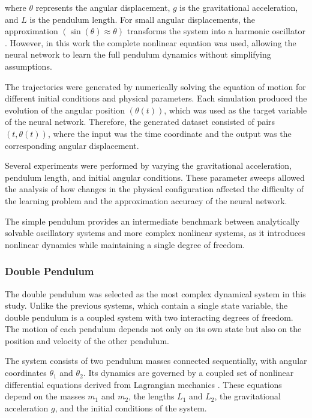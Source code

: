 where $\theta$ represents the angular displacement, $g$ is the gravitational acceleration, and $L$ is the pendulum length.
For small angular displacements, the approximation $(\sin(\theta)\approx\theta)$ transforms the system into a harmonic oscillator \cite{goldstein2002classical}. However, in this work the complete nonlinear equation was used, allowing the neural network to learn the full pendulum dynamics without simplifying assumptions.

The trajectories were generated by numerically solving the equation of motion for different initial conditions and physical parameters. Each simulation produced the evolution of the angular position $(\theta(t))$, which was used as the target variable of the neural network. Therefore, the generated dataset consisted of pairs $(t,\theta(t))$, where the input was the time coordinate and the output was the corresponding angular displacement.

Several experiments were performed by varying the gravitational acceleration, pendulum length, and initial angular conditions. These parameter sweeps allowed the analysis of how changes in the physical configuration affected the difficulty of the learning problem and the approximation accuracy of the neural network.

The simple pendulum provides an intermediate benchmark between analytically solvable oscillatory systems and more complex nonlinear systems, as it introduces nonlinear dynamics while maintaining a single degree of freedom.
\subsubsection{Double Pendulum}
The double pendulum was selected as the most complex dynamical system in this study. Unlike the previous systems, which contain a single state variable, the double pendulum is a coupled system with two interacting degrees of freedom. The motion of each pendulum depends not only on its own state but also on the position and velocity of the other pendulum.

The system consists of two pendulum masses connected sequentially, with angular coordinates $\theta_1$ and $\theta_2$. Its dynamics are governed by a coupled set of nonlinear differential equations derived from Lagrangian mechanics \cite{goldstein2002classical}. These equations depend on the masses $m_1$ and $m_2$, the lengths $L_1$ and $L_2$, the gravitational acceleration $g$, and the initial conditions of the system.

